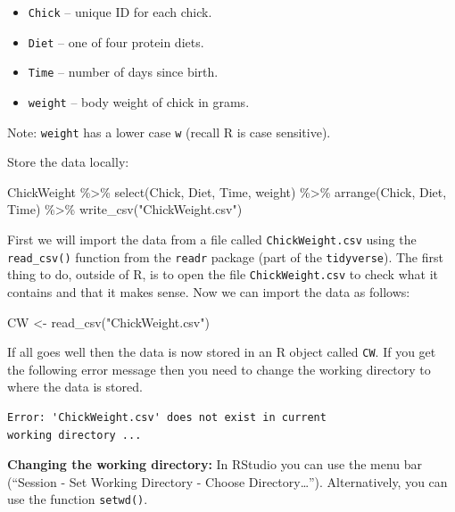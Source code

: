 \documentclass[
  14pt,
]{memoir}
\newenvironment{Shaded}{\begin{snugshade}}{\end{snugshade}}
\newcommand{\FunctionTok}[1]{\textcolor[rgb]{0.00,0.00,0.00}{#1}}
\newcommand{\NormalTok}[1]{#1}
\newcommand{\OtherTok}[1]{\textcolor[rgb]{0.56,0.35,0.01}{#1}}
\newcommand{\SpecialCharTok}[1]{\textcolor[rgb]{0.00,0.00,0.00}{#1}}
\newcommand{\StringTok}[1]{\textcolor[rgb]{0.31,0.60,0.02}{#1}}
\providecommand{\tightlist}{%
  \setlength{\itemsep}{0pt}\setlength{\parskip}{0pt}}
\begin{document}
\begin{itemize}
\tightlist
\item
  \texttt{Chick} -- unique ID for each chick.
\item
  \texttt{Diet} -- one of four protein diets.
\item
  \texttt{Time} -- number of days since birth.
\item
  \texttt{weight} -- body weight of chick in grams.
\end{itemize}

Note: \texttt{weight} has a lower case \texttt{w} (recall R is case sensitive).

Store the data locally:

\begin{Shaded}
\begin{Highlighting}[]
\NormalTok{ChickWeight }\SpecialCharTok{\%\textgreater{}\%}
  \FunctionTok{select}\NormalTok{(Chick, Diet, Time, weight) }\SpecialCharTok{\%\textgreater{}\%} 
  \FunctionTok{arrange}\NormalTok{(Chick, Diet, Time) }\SpecialCharTok{\%\textgreater{}\%} 
  \FunctionTok{write\_csv}\NormalTok{(}\StringTok{"ChickWeight.csv"}\NormalTok{)}
\end{Highlighting}
\end{Shaded}

First we will import the data from a file called \texttt{ChickWeight.csv} using the \texttt{read\_csv()}
function from the \texttt{readr} package (part of the \texttt{tidyverse}). The first thing to do,
outside of R, is to open the file \texttt{ChickWeight.csv} to check what it contains and that
it makes sense. Now we can import the data as follows:

\begin{Shaded}
\begin{Highlighting}[]
\NormalTok{CW }\OtherTok{\textless{}{-}} \FunctionTok{read\_csv}\NormalTok{(}\StringTok{"ChickWeight.csv"}\NormalTok{)}
\end{Highlighting}
\end{Shaded}

If all goes well then the data is now stored in an R object called \texttt{CW}. If you get the
following error message then you need to change the working directory to where the data is
stored.

\begin{verbatim}
Error: 'ChickWeight.csv' does not exist in current
working directory ...
\end{verbatim}

\textbf{Changing the working directory:}
In RStudio you can use the menu bar (``Session - Set Working Directory - Choose Directory\ldots{}''). Alternatively, you can use the function \texttt{setwd()}.
\end{document}
